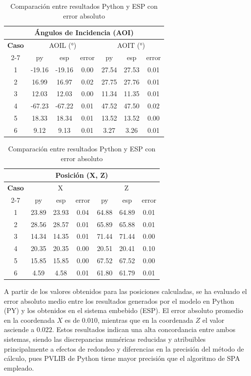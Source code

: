 \begin{table}[h!]
	\begin{tabular}{|c|ccc|ccc|}
		\hline
		\multicolumn{7}{|c|}{\textbf{Ángulos de Incidencia (AOI)}} \\ \hline
		\textbf{Caso} &
		\multicolumn{3}{c|}{AOIL (°)} &
		\multicolumn{3}{c|}{AOIT (°)} \\ \cline{2-7}
		& py & esp & error & py & esp & error \\ \hline
		1 & -19.16 & -19.16 & 0.00 & 27.54 & 27.53 & 0.01 \\
		2 & 16.99  & 16.97  & 0.02 & 27.75 & 27.76 & 0.01 \\
		3 & 12.03  & 12.03   & 0.00 & 11.34 & 11.35 & 0.01 \\
		4 & -67.23 & -67.22 & 0.01 & 47.52 & 47.50 & 0.02 \\
		5 & 18.33  & 18.34  & 0.01 & 13.52 & 13.52 & 0.00 \\ 
		6 & 9.12  & 9.13  & 0.01 & 3.27 & 3.26 & 0.01  \\ \hline
	\end{tabular}
	
	\vspace{0.4cm}
	
	\begin{tabular}{|c|ccc|ccc|}
		\hline
		\multicolumn{7}{|c|}{\textbf{Posición (X, Z)}} \\ \hline
		\textbf{Caso} &
		\multicolumn{3}{c|}{X} &
		\multicolumn{3}{c|}{Z} \\ \cline{2-7}
		& py & esp & error & py & esp & error \\ \hline
		1 & 23.89 & 23.93 & 0.04 & 64.88 & 64.89 & 0.01 \\
		2 & 28.56 & 28.57 & 0.01 & 65.89 & 65.88 & 0.01 \\
		3 & 14.34 & 14.35 & 0.01 & 71.44 & 71.44 & 0.00 \\
		4 & 20.35 & 20.35 & 0.00 & 20.51 & 20.41 & 0.10 \\
		5 & 15.85 & 15.85 & 0.00 & 67.52 & 67.52 & 0.00 \\ 
		6 & 4.59  & 4.58  & 0.01 & 61.80 & 61.79 & 0.01 \\ \hline
	\end{tabular}
	\caption{Comparación entre resultados Python y ESP con error absoluto}
	\label{tab:auto}
\end{table}

A partir de los valores obtenidos para las posiciones calculadas, se ha evaluado el error absoluto medio entre los resultados generados por el modelo en Python (PY) y los obtenidos en el sistema embebido (ESP). El error absoluto promedio en la coordenada $X$ es de $0.010$, mientras que en la coordenada $Z$ el valor asciende a $0.022$. Estos resultados indican una alta concordancia entre ambos sistemas, siendo las discrepancias numéricas reducidas y atribuibles principalmente a efectos de redondeo y diferencias en la precisión del método de cálculo, pues PVLIB de Python tiene mayor precisión que el algoritmo de SPA empleado. 


